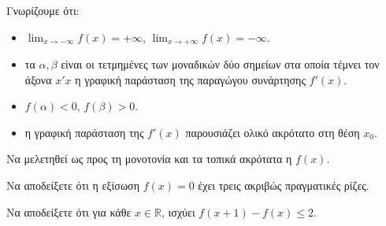 Γνωρίζουμε ότι:
\begin{itemize}
    \item $\lim_{x \to -\infty} f(x) = +\infty$, $\lim_{x \to +\infty} f(x) = -\infty$.
    \item τα $\alpha, \beta$ είναι οι τετμημένες των μοναδικών δύο σημείων στα οποία τέμνει τον άξονα $x'x$ η γραφική παράσταση της παραγώγου συνάρτησης $f'(x)$.
    \item $f(\alpha) < 0$, $f(\beta) > 0$.
    \item η γραφική παράσταση της $f'(x)$ παρουσιάζει ολικό ακρότατο στη θέση $x_0$.
\end{itemize}

\begin{alist}
    \item Να μελετηθεί ως προς τη μονοτονία και τα τοπικά ακρότατα η $f(x)$. 
    \item Να αποδείξετε ότι η εξίσωση $f(x) = 0$ έχει τρεις ακριβώς πραγματικές ρίζες. 
    \item Να αποδείξετε ότι για κάθε $x \in \mathbb{R}$, ισχύει $f(x + 1) - f(x) \le 2$. 
\end{alist}